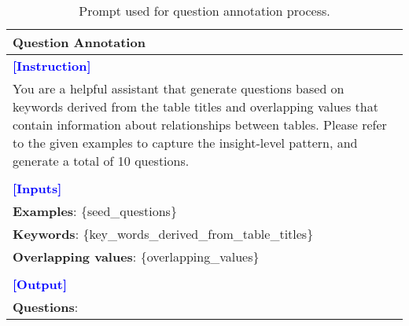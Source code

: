 \begin{table*}[htbp]
\centering
\begin{tabularx}{\textwidth}{X}
\toprule
\textbf{Question Annotation} \\ \midrule
\textcolor{blue}{\textbf{[Instruction]}} \\
You are a helpful assistant that generate questions based on keywords derived from the table titles and overlapping values that contain information about relationships between tables. Please refer to the given examples to capture the insight-level pattern, and generate a total of 10 questions. \\\\
\textcolor{blue}{\textbf{[Inputs]}} \\
\textbf{Examples}: \{seed\_questions\} \\
\textbf{Keywords}: \{key\_words\_derived\_from\_table\_titles\} \\
\textbf{Overlapping values}: \{overlapping\_values\} \\\\
\textcolor{blue}{\textbf{[Output]}} \\
\textbf{Questions}: \\ \bottomrule
\end{tabularx}
\caption{Prompt used for question annotation process.}
\label{pmt:step2}
\end{table*}